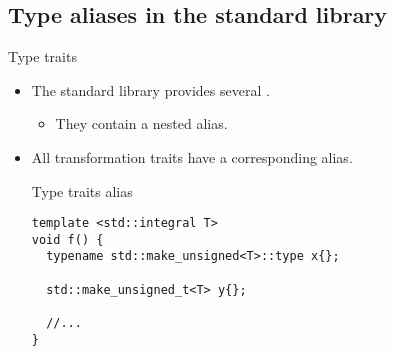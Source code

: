 \subsection{Type aliases in the standard library}

\begin{frame}[t,fragile]{Type traits}
\begin{itemize}
  \item The standard library provides several .
    \begin{itemize}
      \item They contain a nested  alias.
    \end{itemize}

  \item All transformation traits have a corresponding  alias.

\begin{block}{Type traits alias}
\begin{lstlisting}
template <std::integral T>
void f() {
  typename std::make_unsigned<T>::type x{};

  std::make_unsigned_t<T> y{};

  //...
}
\end{lstlisting}
\end{block}

\end{itemize}
\end{frame}
